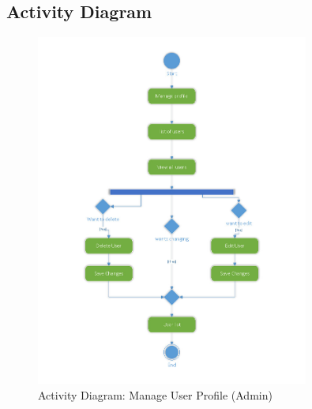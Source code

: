 \documentclass[12pt]{report}
\begin{document}
\subsection{Activity Diagram}

\begin{figure}[ht]
    \centering
    \includegraphics[width=0.8\textwidth]{Media/Binder2.pdf_Page_01.jpg} %
    \caption{Activity Diagram: Manage User Profile (Admin)}
    \label{fig:drawing1}
\end{figure}
\end{document}
